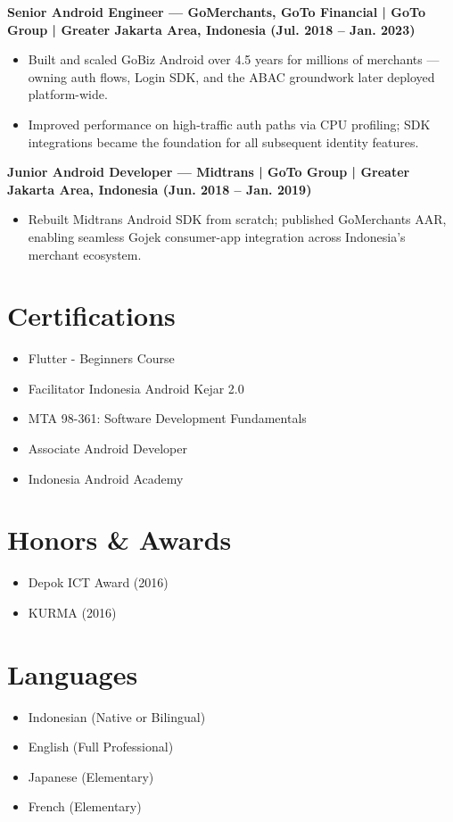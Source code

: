 \documentclass[10pt]{article}
\begin{document}
\textbf{Senior Android Engineer --- GoMerchants, GoTo Financial | GoTo Group | Greater Jakarta Area, Indonesia (Jul. 2018 -- Jan. 2023)}
\begin{itemize}
\item Built and scaled GoBiz Android over 4.5 years for millions of merchants --- owning auth flows, Login SDK, and the ABAC groundwork later deployed platform-wide.
\item Improved performance on high-traffic auth paths via CPU profiling; SDK integrations became the foundation for all subsequent identity features.
\end{itemize}
 
\textbf{Junior Android Developer --- Midtrans | GoTo Group | Greater Jakarta Area, Indonesia (Jun. 2018 -- Jan. 2019)}
\begin{itemize}
\item Rebuilt Midtrans Android SDK from scratch; published GoMerchants AAR, enabling seamless Gojek consumer-app integration across Indonesia's merchant ecosystem.
\end{itemize}
 
\section*{Certifications}
\begin{itemize}
\item Flutter - Beginners Course
\item Facilitator Indonesia Android Kejar 2.0
\item MTA 98-361: Software Development Fundamentals
\item Associate Android Developer
\item Indonesia Android Academy
\end{itemize}
 
\section*{Honors \& Awards}
\begin{itemize}
\item Depok ICT Award (2016)
\item KURMA (2016)
\end{itemize}
 
\section*{Languages}
\begin{itemize}
\item Indonesian (Native or Bilingual)
\item English (Full Professional)
\item Japanese (Elementary)
\item French (Elementary)
\end{itemize}
 
\end{document}

